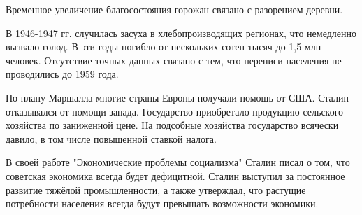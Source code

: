 \documentclass{article}
\begin{document}
Временное увеличение благосостояния горожан связано с разорением деревни.

В 1946-1947 гг. случилась засуха в хлебопроизводящих регионах, что немедленно вызвало голод. В эти годы погибло от нескольких сотен тысяч до 1,5 млн человек. Отсутствие точных данных связано с тем, что переписи населения не проводились до 1959 года.

По плану Маршалла многие страны Европы получали помощь от США. Сталин отказывался от помощи запада. Государство приобретало продукцию сельского хозяйства по заниженной цене. На подсобные хозяйства государство всячески давило, в том числе повышенной ставкой налога.

В своей работе "Экономические проблемы социализма" Сталин писал о том, что советская экономика всегда будет дефицитной. Сталин выступил за постоянное развитие тяжёлой промышленности, а также утверждал, что растущие потребности населения всегда будут превышать возможности экономики.
\end{document}
